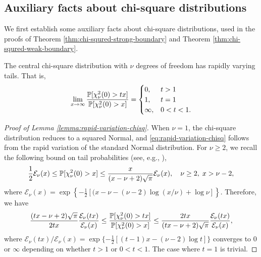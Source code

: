 \subsection{Auxiliary facts about chi-square distributions}

We first establish some auxiliary facts about chi-square distributions, used in the proofs of Theorem \ref{thm:chi-squred-strong-boundary} and Theorem \ref{thm:chi-squred-weak-boundary}.

\begin{lemma} \label{lemma:rapid-variation-chisq}
The central chi-square distribution with $\nu$ degrees of freedom has rapidly varying tails.
That is, 
\begin{equation} \label{eq:rapid-variation-chisq}
    \lim_{x\to\infty}\frac{\P[\chi_\nu^2(0)>tx]}{\P[\chi_\nu^2(0)>x]} = 
    \begin{cases}
    0, & t > 1 \\
    1, & t = 1 \\
    \infty, & 0 < t < 1.
\end{cases}
\end{equation}
\end{lemma}

\begin{proof}[Proof of Lemma \ref{lemma:rapid-variation-chisq}]
When $\nu=1$, the chi-square distribution reduces to a squared Normal, and \eqref{eq:rapid-variation-chisq} follows from the rapid variation of the standard Normal distribution.
For $\nu\ge2$, we recall the following bound on tail probabilities (see, e.g., \citep{inglot2010inequalities}),
$$
\frac{1}{2}\mathcal{E}_\nu(x) \le \P[\chi_\nu^2(0)>x] \le \frac{x}{(x-\nu+2)\sqrt{\pi}} \mathcal{E}_\nu(x), \quad \nu\ge2,\;x>\nu-2,
$$
where $\mathcal{E}_\nu(x) = \exp\left\{-\frac{1}{2}[(x-\nu-(\nu-2)\log(x/\nu) + \log\nu]\right\}$.
Therefore, we have 
$$
\frac{(tx-\nu+2)\sqrt{\pi}}{2tx}\frac{\mathcal{E}_\nu(tx)}{\mathcal{E}_\nu(x)} 
\le \frac{\P[\chi_\nu^2(0)>tx]}{\P[\chi_\nu^2(0)>x]}
\le \frac{2tx}{(tx-\nu+2)\sqrt{\pi}}\frac{\mathcal{E}_\nu(tx)}{\mathcal{E}_\nu(x)},
$$
where ${\mathcal{E}_\nu(tx)}/{\mathcal{E}_\nu(x)} = \exp\{-\frac{1}{2}[(t-1)x-(\nu-2)\log{t}]\}$ converges to $0$ or $\infty$ depending on whether $t>1$ or $0<t<1$.
The case where $t=1$ is trivial.
\end{proof}

